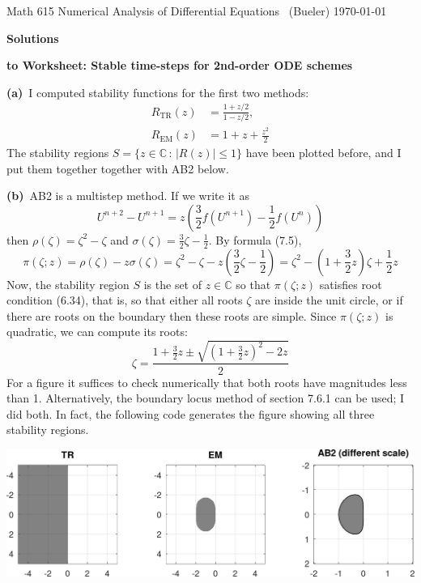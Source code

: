 \documentclass[11pt]{amsart}
\newcommand{\normalspacing}{\renewcommand{\baselinestretch}{1.03}
        \tiny\normalsize}
\newcommand{\CC}{\mathbb{C}}
\newcommand{\prob}[1]{\bigskip\noindent\textbf{#1}\, }
\newcommand{\mfile}[2]{
	\medskip
	\begin{quote}
		\bigskip
		\VerbatimInput[frame=single,framesep=3mm,label=\fbox{\normalsize \textsl{\,#1\,}},fontfamily=courier,fontsize=\scriptsize]{#2}
		\bigskip
	\end{quote}
}
\begin{document}
\scriptsize
\noindent Math 615 Numerical Analysis of Differential Equations \, (Bueler) \hfill  \today
\normalsize\bigskip
\normalspacing

\Large\centerline{\textbf{Solutions}}

\normalsize
\centerline{\textbf{to Worksheet:  Stable time-steps for 2nd-order ODE schemes}}

\bigskip\medskip
\thispagestyle{empty}
\normalspacing


\prob{(a)}  I computed stability functions for the first two methods:
\begin{align*}
R_{\text{TR}}(z) &= \frac{1+z/2}{1-z/2}, \\
R_{\text{EM}}(z) &= 1 + z + \frac{z^2}{2}
\end{align*}
The stability regions $S = \{z\in\CC\,:\,|R(z)|\le 1\}$ have been plotted before, and I put them together together with AB2 below.

\prob{(b)}  AB2 is a multistep method.  If we write it as
	$$U^{n+2} - U^{n+1} = z \left(\frac{3}{2} f(U^{n+1}) - \frac{1}{2} f(U^n)\right)$$
then $\rho(\zeta)=\zeta^2-\zeta$ and $\sigma(\zeta)= \frac{3}{2} \zeta - \frac{1}{2}$.  By formula (7.5),
	$$\pi(\zeta; z) = \rho(\zeta) - z\sigma(\zeta) = \zeta^2-\zeta - z\left(\frac{3}{2} \zeta - \frac{1}{2}\right) = \zeta^2-(1+\frac{3}{2}z) \zeta + \frac{1}{2}z$$
Now, the stability region $S$ is the set of $z\in\CC$ so that $\pi(\zeta; z)$ satisfies root condition (6.34), that is, so that either all roots $\zeta$ are inside the unit circle, or if there are roots on the boundary then these roots are simple.  Since $\pi(\zeta; z)$ is quadratic, we can compute its roots:
	$$\zeta = \frac{1+\frac{3}{2}z \pm \sqrt{(1+\frac{3}{2}z)^2 - 2z}}{2}$$
For a figure it suffices to check numerically that both roots have magnitudes less than 1.  Alternatively, the boundary locus method of section 7.6.1 can be used; I did both.  In fact, the following code generates the figure showing all three stability regions.

\mfile{regions.m}{regions.m}

\medskip
\includegraphics[width=\textwidth]{regions.png}
\end{document}
